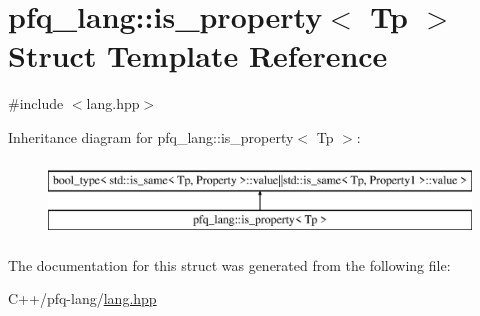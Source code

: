 \hypertarget{structpfq__lang_1_1is__property}{\section{pfq\+\_\+lang\+:\+:is\+\_\+property$<$ Tp $>$ Struct Template Reference}
\label{structpfq__lang_1_1is__property}
}


{\ttfamily \#include $<$lang.\+hpp$>$}

Inheritance diagram for pfq\+\_\+lang\+:\+:is\+\_\+property$<$ Tp $>$\+:\begin{figure}[H]
\begin{center}
\leavevmode
\includegraphics[height=2.000000cm]{structpfq__lang_1_1is__property}
\end{center}
\end{figure}


The documentation for this struct was generated from the following file\+:\begin{DoxyCompactItemize}
\item 
C++/pfq-\/lang/\hyperlink{lang_8hpp}{lang.\+hpp}\end{DoxyCompactItemize}
